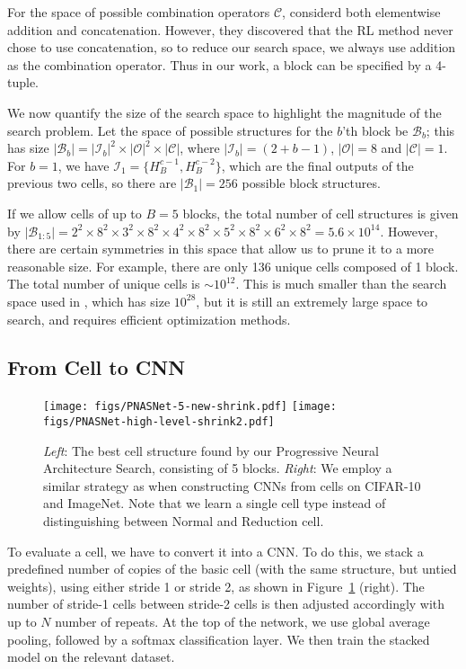 \documentclass[runningheads]{llncs}
\begin{document}
For the space of possible combination operators $\mathcal{C}$,
 \cite{DBLP:journals/corr/ZophVSL17} considerd both
 elementwise addition and concatenation.
However, they discovered that the RL method never chose to use concatenation,
so to reduce our search space, we always use addition as the combination operator.
Thus in our work, a block can be specified by a 4-tuple.


We now quantify the size of the search space to highlight the magnitude of the search problem. 
Let the space of possible structures for the $b$'th block
be $\mathcal{B}_b$;
this has size
$|\mathcal{B}_b|= |\mathcal{I}_b|^2 \times |\mathcal{O}|^2 \times |\mathcal{C}|$,
where 
$|\mathcal{I}_b|=(2+b-1)$,
$|\mathcal{O}|=8$ and $|\mathcal{C}|=1$.
For $b=1$, we have 
$\mathcal{I}_1 = \{H_B^{c-1}, H_B^{c-2}\}$,
which 
are the final outputs of the previous two cells,
so there are $|\mathcal{B}_1|=256$ possible block structures. 


If we allow cells of up to $B=5$ blocks,
the total number of cell structures
is given by
$|\mathcal{B}_{1:5}| = 2^2 \times 8^2 \times 3^2 \times 8^2 \times 4^2 \times 8^2 \times 5^2 \times 8^2 \times 6^2 \times 8^2 = 5.6 \times 10^{14}$. 
However, there are certain symmetries in this space that allow us to prune it
to a more reasonable size.
For example, there are only 136 unique cells composed of 1 block.
The total number of unique cells is $\sim 10^{12}$.
This is much smaller than the search space used in 
 \cite{DBLP:journals/corr/ZophVSL17}, which has size
 $10^{28}$,
but it is still an extremely large space to search, and requires efficient 
optimization methods.

\subsection{From Cell to CNN}\begin{figure}[t]
\centering
\texttt{[image: figs/PNASNet-5-new-shrink.pdf]}
\qquad
\texttt{[image: figs/PNASNet-high-level-shrink2.pdf]}
\caption{
\emph{Left}: 
The best cell structure found by our Progressive Neural Architecture Search, consisting of 5 blocks.
\emph{Right}:
We employ a similar strategy as \cite{DBLP:journals/corr/ZophVSL17} when constructing CNNs from cells on CIFAR-10 and ImageNet. 
Note that we learn a single cell type instead of distinguishing between Normal and Reduction cell.
}
\label{fig:network}
\end{figure}

To evaluate a cell, we have to convert it into a CNN.
To do this, 
we stack a predefined number of copies of the basic cell (with the same structure, but untied weights),
using either stride 1 or stride 2, as shown in 
Figure~\ref{fig:network} (right). 
The number of stride-1 cells between stride-2 cells is then adjusted accordingly with up to $N$ number of repeats.
At the top of the network, we use global average pooling, followed by a softmax classification layer.
We then train the stacked model on the relevant dataset.
\end{document}

